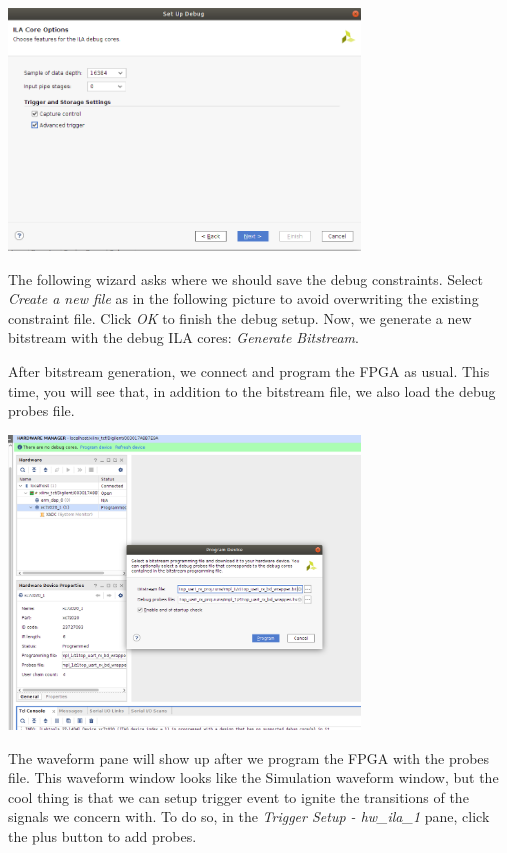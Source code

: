 \documentclass[11pt]{article}
\begin{document}
\begin{center}
\includegraphics[width=0.7\textwidth]{figs/vivado-ila-3.png}
\end{center}

The following wizard asks where we should save the debug constraints. Select \emph{Create a new file} as in the following picture to avoid overwriting the existing constraint file. Click \emph{OK} to finish the debug setup. Now, we generate a new bitstream with the debug ILA cores: \emph{Generate Bitstream}.

After bitstream generation, we connect and program the FPGA as usual. This time, you will see that, in addition to the bitstream file, we also load the debug probes file.

\begin{center}
\includegraphics[width=0.7\textwidth]{figs/vivado-ila-5.png}
\end{center}

The waveform pane will show up after we program the FPGA with the probes file. This waveform window looks like the Simulation waveform window, but the cool thing is that we can setup trigger event to ignite the transitions of the signals we concern with. To do so, in the \emph{Trigger Setup - hw\_ila\_1} pane, click the plus button to add probes.
\end{document}
